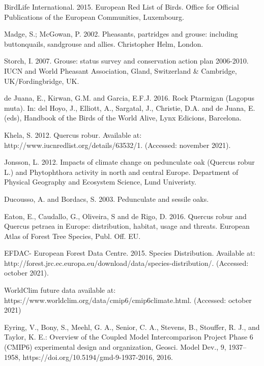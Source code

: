\documentclass[12pt,a4paper]{article}
\begin{document}
\begin{thebibliography}{999}
BirdLife International. 2015. European Red List of Birds. Office for Official Publications of the European Communities, Luxembourg.

Madge, S.; McGowan, P. 2002. Pheasants, partridges and grouse: including buttonquails, sandgrouse and allies. Christopher Helm, London.

Storch, I. 2007. Grouse: status survey and conservation action plan 2006-2010. IUCN and World Pheasant Association, Gland, Switzerland \& Cambridge, UK/Fordingbridge, UK.

de Juana, E., Kirwan, G.M. and Garcia, E.F.J. 2016. Rock Ptarmigan (Lagopus muta). In: del Hoyo, J., Elliott, A., Sargatal, J., Christie, D.A. and de Juana, E. (eds), Handbook of the Birds of the World Alive, Lynx Edicions, Barcelona.

Khela, S. 2012. Quercus robur. Available at: http://www.iucnredlist.org/details/63532/1. (Accessed: november 2021).

Jonsson, L. 2012. Impacts of climate change on pedunculate oak (Quercus robur L.) and Phytophthora activity in north and central Europe. Department of Physical Geography and Ecosystem Science, Lund Univeristy.

Ducousso, A. and Bordacs, S. 2003. Pedunculate and sessile oaks.

Eaton, E., Caudallo, G., Oliveira, S and de Rigo, D. 2016. Quercus robur and Quercus petraea in Europe: distribution, habitat, usage and threats. European Atlas of Forest Tree Species, Publ. Off. EU.

EFDAC- European Forest Data Centre. 2015. Species Distribution. Available at: http://forest.jrc.ec.europa.eu/download/data/species-distribution/. (Accessed: october 2021).

WorldClim future data available at: https://www.worldclim.org/data/cmip6/cmip6climate.html. (Accessed: october 2021)

Eyring, V., Bony, S., Meehl, G. A., Senior, C. A., Stevens, B., Stouffer, R. J., and Taylor, K. E.: Overview of the Coupled Model Intercomparison Project Phase 6 (CMIP6) experimental design and organization, Geosci. Model Dev., 9, 1937–1958, https://doi.org/10.5194/gmd-9-1937-2016, 2016.


\end{thebibliography}
\end{document}
